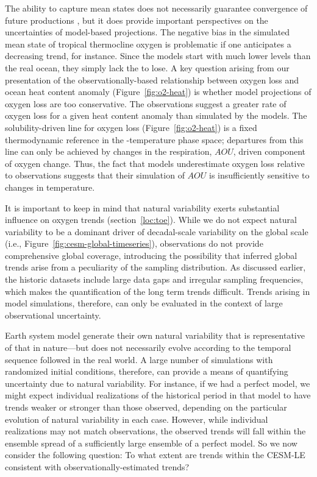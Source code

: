 \documentclass[draft,linenumbers]{report_chapter}
\begin{document}
The ability to capture mean states does not necessarily guarantee convergence of future productions \citep{Tagklis-Bracco-etal-2017}, but it does provide important perspectives on the uncertainties of model-based projections.
The negative bias in the simulated mean state of tropical thermocline oxygen is problematic if one anticipates a decreasing  trend, for instance.
Since the models start with much lower  levels than the real ocean, they simply lack the  to lose.
A key question arising from our presentation of the observationally-based relationship between oxygen loss and ocean heat content anomaly (Figure~\ref{fig:o2-heat}) is whether model projections of oxygen loss are too conservative.
The observations suggest a greater rate of oxygen loss for a given heat content anomaly than simulated by the models.
The solubility-driven line for oxygen loss (Figure~\ref{fig:o2-heat}) is a fixed thermodynamic reference in the -temperature phase space; departures from this line can only be achieved by changes in the respiration, $AOU$, driven component of oxygen change.
Thus, the fact that models underestimate oxygen loss relative to observations suggests that their simulation of $AOU$ is insufficiently sensitive to changes in temperature.

It is important to keep in mind that natural variability exerts substantial influence on oxygen trends (section~\ref{loc:toe}).
While we do not expect natural variability to be a dominant driver of decadal-scale variability on the global scale (i.e., Figure~\ref{fig:cesm-global-timeseries}), observations do not provide comprehensive global coverage, introducing the possibility that inferred global trends arise from a peculiarity of the sampling distribution.
As discussed earlier, the historic  datasets include large data gaps and irregular sampling frequencies, which makes the quantification of the long term trends difficult.
Trends arising in model simulations, therefore, can only be evaluated in the context of large observational uncertainty.

Earth system model generate their own natural variability that is representative of that in nature---but does not necessarily evolve according to the temporal sequence followed in the real world.
A large number of simulations with randomized initial conditions, therefore, can provide a means of quantifying uncertainty due to natural variability.
For instance, if we had a perfect model, we might expect individual realizations of the historical period in that model to have trends weaker or stronger than those observed, depending on the particular evolution of natural variability in each case.
However, while individual realizations may not match observations, the observed trends will fall within the ensemble spread of a sufficiently large ensemble of a perfect model.
So we now consider the following question:
To what extent are  trends within the CESM-LE consistent with observationally-estimated trends?
\end{document}
